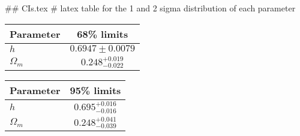 ## CIs.tex
# latex table for the 1 and 2 sigma distribution of each parameter

\begin{tabular} { l  c}
 Parameter &  68\% limits\\
\hline
{\boldmath$h              $} & $0.6947\pm 0.0079          $\\
{\boldmath$\Omega_m       $} & $0.248^{+0.019}_{-0.022}   $\\
\hline
\end{tabular}

\begin{tabular} { l  c}
 Parameter &  95\% limits\\
\hline
{\boldmath$h              $} & $0.695^{+0.016}_{-0.016}   $\\
{\boldmath$\Omega_m       $} & $0.248^{+0.041}_{-0.039}   $\\
\hline
\end{tabular}
